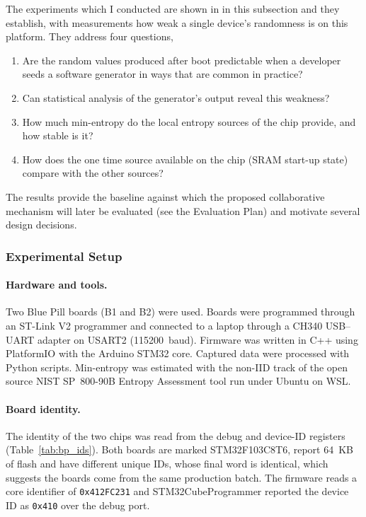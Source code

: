 \documentclass[a4paper, 12pt]{article}
\begin{document}
The experiments which I conducted are shown in in this subsection and they establish, with measurements how weak a single device's randomness is on this platform. They address four questions,
 
\begin{enumerate}
    \item Are the random values produced after boot predictable when a developer seeds a software generator in ways that are common in practice?
    \item Can statistical analysis of the generator's output reveal this weakness?
    \item How much min-entropy do the local entropy sources of the chip provide, and how stable is it?
    \item How does the one time source available on the chip (SRAM start-up state) compare with the other sources?
\end{enumerate}
 
The results provide the baseline against which the proposed collaborative mechanism will later be evaluated (see the Evaluation Plan) and motivate several design decisions.
 
\subsubsection{Experimental Setup}
 
\paragraph{Hardware and tools.} Two Blue Pill boards (B1 and B2) were used. Boards were programmed through an ST-Link V2 programmer and connected to a laptop through a CH340 USB--UART adapter on USART2 (115200~baud). Firmware was written in C++ using PlatformIO with the Arduino STM32 core. Captured data were processed with Python scripts. Min-entropy was estimated with the non-IID track of the open source NIST SP~800-90B Entropy Assessment tool \citep{turan2018sp80090b} run under Ubuntu on WSL.
 
\paragraph{Board identity.} The identity of the two chips was read from the debug and device-ID registers (Table~\ref{tab:bp_ids}). Both boards are marked STM32F103C8T6, report 64~KB of flash and have different unique IDs, whose final word is identical, which suggests the boards come from the same production batch. The firmware reads a core identifier of \texttt{0x412FC231} and STM32CubeProgrammer reported the device ID as \texttt{0x410} over the debug port.
 
\end{document}
